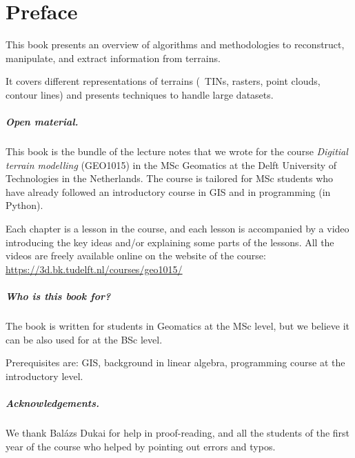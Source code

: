 


\chapter*{Preface}

This book presents an overview of algorithms and methodologies to reconstruct, manipulate, and extract information from terrains.

It covers different representations of terrains (\eg\ TINs, rasters, point clouds, contour lines) and presents techniques to handle large datasets.



\paragraph*{Open material.}
This book is the bundle of the lecture notes that we wrote for the course \emph{Digitial terrain modelling} (GEO1015) in the MSc Geomatics at the Delft University of Technologies in the Netherlands.
The course is tailored for MSc students who have already followed an introductory course in GIS and in programming (in Python).

Each chapter is a lesson in the course, and each lesson is accompanied by a video introducing the key ideas and/or explaining some parts of the lessons.
All the videos are freely available online on the website of the course: \url{https://3d.bk.tudelft.nl/courses/geo1015/}


\paragraph*{Who is this book for?}
The book is written for students in Geomatics at the MSc level, but we believe it can be also used for at the BSc level.

Prerequisites are: GIS, background in linear algebra, programming course at the introductory level.


\paragraph*{Acknowledgements.}
We thank Balázs Dukai for help in proof-reading, and all the students of the first year of the course who helped by pointing out errors and typos.






